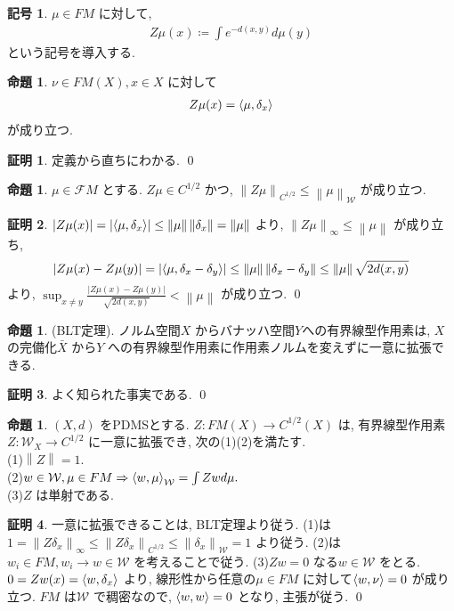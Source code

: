 \documentclass[10pt, fleqn, label-section=none]{bxjsarticle}
\theoremstyle{definition}
\newtheorem{prop}[dfn]{命題}
\newtheorem{notation}[dfn]{記号}
\newtheorem*{pf*}{証明}
\newcommand{\tbra}[1]{\mleft\langle#1\mright\rangle}
\newcommand{\abs}[1]{\left|#1\right|}
\newcommand{\norm}[1]{\left\|#1\right\|}
\newcommand{\naraba}{\Rightarrow}
\renewcommand{\;}{\, ; \,}
\begin{document}
\begin{notation}$\mu \in FM$ に対して, 
\begin{align*} Z\mu(x) \coloneqq \int e^{-d(x,y)} d\mu(y)\end{align*}
という記号を導入する. 
\end{notation}

\begin{prop}$\nu \in FM(X), x \in X$ に対して
\begin{align*} Z\mu(x) = \tbra{\mu, \delta_x} \end{align*}
が成り立つ. 
\end{prop}
\begin{pf*}
定義から直ちにわかる. 
\qed
\end{pf*}



\begin{prop}$\mu \in \mathcal FM$ とする. $Z \mu \in C^{1/2}$ かつ, $\norm{Z \mu}_{C^{1/2}} \leq \norm{\mu}_{\mathcal W}$ が成り立つ. 

\end{prop}
\begin{pf*}
$\abs{Z \mu (x)} = \abs{\tbra{\mu, \delta_x}} \leq \norm \mu \norm {\delta_x} = \norm \mu$ より, $\norm{Z\mu}_\infty \leq \norm \mu$ が成り立ち, 
\begin{align*} \abs{Z \mu (x) - Z \mu (y)} = \abs{\tbra{\mu, \delta_x - \delta_y}} \leq \norm \mu \norm{\delta_x - \delta_y} \leq \norm \mu \sqrt{2 d(x, y) }\end{align*}
より, $\sup_{x \neq y} \frac{\abs{Z\mu (x) - Z \mu(y)}}{\sqrt{2d(x, y)}} < \norm \mu$
が成り立つ. 
\qed
\end{pf*}

\begin{prop}(BLT定理). ノルム空間$X$ からバナッハ空間$Y$への有界線型作用素は, $X$ の完備化$\bar X$ から$Y$ への有界線型作用素に作用素ノルムを変えずに一意に拡張できる.

\end{prop}
\begin{pf*}
よく知られた事実である. 
\qed
\end{pf*}

\begin{prop}$(X,d)$ をPDMSとする. $Z: FM(X) \rightarrow C^{1/2}(X)$ は, 有界線型作用素$Z: \mathcal W_X \rightarrow C^{1/2}$ に一意に拡張でき, 次の(1)(2)を満たす. \\
(1)$\norm Z = 1.$ \\
(2)$w \in \mathcal W, \mu \in FM \naraba \tbra{w, \mu}_\mathcal W = \int Zw d\mu.$ \\
(3)$Z$ は単射である. 
\end{prop}
\begin{pf*} 一意に拡張できることは, BLT定理より従う. (1)は$1 = \norm{Z \delta_x}_\infty \leq \norm{Z \delta_x}_{C^{1/2}} \leq \norm{\delta_x}_{\mathcal W} = 1$ より従う. (2)は$w_i \in FM, w_i \rightarrow w \in \mathcal W$ を考えることで従う. (3)$Zw = 0$ なる$w \in \mathcal W$ をとる. $0 = Zw(x) = \tbra{w, \delta_x}$ より, 線形性から任意の$\mu \in FM$ に対して$\tbra{w, \nu} = 0$ が成り立つ. $FM$ は$\mathcal W$ で稠密なので, $\tbra{w, w} = 0$ となり, 主張が従う. 
\qed
\end{pf*}
\end{document}
